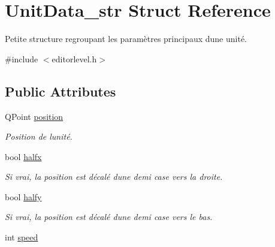 \hypertarget{struct_unit_data__str}{}\section{Unit\+Data\+\_\+str Struct Reference}
\label{struct_unit_data__str}


Petite structure regroupant les paramètres principaux d\textquotesingle{}une unité.  




{\ttfamily \#include $<$editorlevel.\+h$>$}

\subsection*{Public Attributes}
\begin{DoxyCompactItemize}
\item 
\hypertarget{struct_unit_data__str_ae3043d1b98cdd975c3bb3d409e4fff94}{}Q\+Point \hyperlink{struct_unit_data__str_ae3043d1b98cdd975c3bb3d409e4fff94}{position}\label{struct_unit_data__str_ae3043d1b98cdd975c3bb3d409e4fff94}

\begin{DoxyCompactList}\small\item\em Position de l\textquotesingle{}unité. \end{DoxyCompactList}\item 
\hypertarget{struct_unit_data__str_a45215b0d49d28d3eeb883cd8e655cf3e}{}bool \hyperlink{struct_unit_data__str_a45215b0d49d28d3eeb883cd8e655cf3e}{halfx}\label{struct_unit_data__str_a45215b0d49d28d3eeb883cd8e655cf3e}

\begin{DoxyCompactList}\small\item\em Si vrai, la position est décalé d\textquotesingle{}une demi case vers la droite. \end{DoxyCompactList}\item 
\hypertarget{struct_unit_data__str_a1c885dc06eb76926b95a1ecad73a7f4a}{}bool \hyperlink{struct_unit_data__str_a1c885dc06eb76926b95a1ecad73a7f4a}{halfy}\label{struct_unit_data__str_a1c885dc06eb76926b95a1ecad73a7f4a}

\begin{DoxyCompactList}\small\item\em Si vrai, la position est décalé d\textquotesingle{}une demi case vers le bas. \end{DoxyCompactList}\item 
\hypertarget{struct_unit_data__str_a0189b64bcee5c40ddbff6b1b53cb5282}{}int \hyperlink{struct_unit_data__str_a0189b64bcee5c40ddbff6b1b53cb5282}{speed}\label{struct_unit_data__str_a0189b64bcee5c40ddbff6b1b53cb5282}


\end{DoxyCompactItemize}
